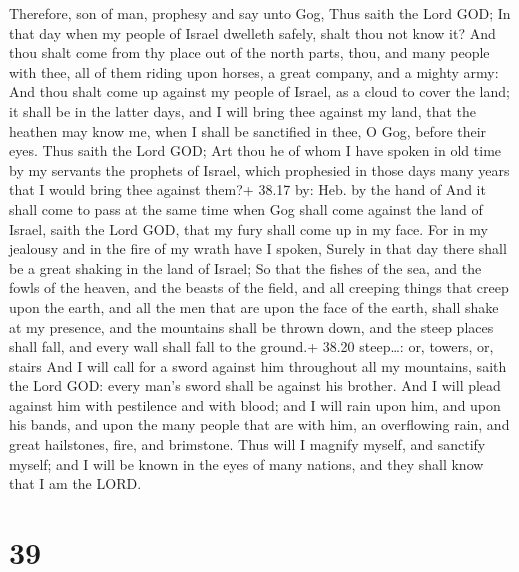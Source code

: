  Therefore, son of man, prophesy and say unto Gog, Thus
saith the Lord GOD; In that day when my people of Israel dwelleth
safely, shalt thou not know it?  And thou shalt come from
thy place out of the north parts, thou, and many people with thee, all
of them riding upon horses, a great company, and a mighty army:
 And thou shalt come up against my people of Israel, as a
cloud to cover the land; it shall be in the latter days, and I will
bring thee against my land, that the heathen may know me, when I shall
be sanctified in thee, O Gog, before their eyes.  Thus
saith the Lord GOD; Art thou he of whom I have spoken in old time by my
servants the prophets of Israel, which prophesied in those days many
years that I would bring thee against them?+ 38.17 by: Heb. by the hand
of  And it shall come to pass at the same time when Gog
shall come against the land of Israel, saith the Lord GOD, that my fury
shall come up in my face.  For in my jealousy and in the
fire of my wrath have I spoken, Surely in that day there shall be a
great shaking in the land of Israel;  So that the fishes of
the sea, and the fowls of the heaven, and the beasts of the field, and
all creeping things that creep upon the earth, and all the men that are
upon the face of the earth, shall shake at my presence, and the
mountains shall be thrown down, and the steep places shall fall, and
every wall shall fall to the ground.+ 38.20 steep\ldots: or, towers, or,
stairs  And I will call for a sword against him throughout
all my mountains, saith the Lord GOD: every man's sword shall be against
his brother.  And I will plead against him with pestilence
and with blood; and I will rain upon him, and upon his bands, and upon
the many people that are with him, an overflowing rain, and great
hailstones, fire, and brimstone.  Thus will I magnify
myself, and sanctify myself; and I will be known in the eyes of many
nations, and they shall know that I am the LORD.

\hypertarget{section-38}{%
\section{39}\label{section-38}}

